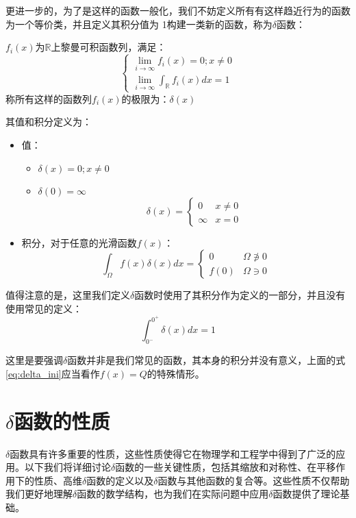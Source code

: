 \documentclass[lang=cn,10pt,newtx,bibend=biber,device=pad]{elegantbook}
\begin{document}
更进一步的，为了是这样的函数一般化，我们不妨定义所有有这样趋近行为的函数为一个等价类，并且定义其积分值为 1构建一类新的函数，称为$\delta$函数\cite{strichartz1994distribution}：
\begin{definition}[$\delta$函数]\label{def:delta_function}
${f_i(x)}$为$\mathbb{R}$上黎曼可积函数列，满足：
\begin{equation}
    \begin{cases}
        \lim\limits_{i\rightarrow\infty}f_i(x)=0;x\neq0\\
        \lim\limits_{i\rightarrow\infty}\int_{\mathbb{R}}f_i(x)dx = 1
    \end{cases}
\end{equation}
称所有这样的函数列${f_i(x)}$的极限为：$\delta(x)$

其值和积分定义为：
\begin{itemize}
    \item 值：
    \begin{itemize}
        \item $\delta(x) = 0;x\neq0$
        \item $\delta(0) = \infty$
        \begin{equation}
            \delta(x)=
            \begin{cases}
            0 &x\neq0 \\
            \infty &x=0
            \end{cases}
        \end{equation}
    \end{itemize}
    \item 积分，对于任意的光滑函数$f(x)$：
    \begin{equation}
        \int_{\Omega}f(x)\delta(x)dx=\begin{cases}0 & \Omega\not\owns0\\f(0)&\Omega\owns 0\end{cases}
    \end{equation}
\end{itemize}
\end{definition}
值得注意的是，这里我们定义$\delta$函数时使用了其积分作为定义的一部分，并且没有使用常见的定义：
\begin{equation}\label{eq:delta_ini}
    \int_{0^-}^{0^+}\delta(x)dx=1    
\end{equation}

这里是要强调$\delta$函数并非是我们常见的函数，其本身的积分并没有意义，上面的式\ref{eq:delta_ini}应当看作$f(x)=Q$的特殊情形。
\section{$\delta$函数的性质}
$\delta$函数具有许多重要的性质，这些性质使得它在物理学和工程学中得到了广泛的应用。以下我们将详细讨论$\delta$函数的一些关键性质，包括其缩放和对称性、在平移作用下的性质、高维$\delta$函数的定义以及$\delta$函数与其他函数的复合等。这些性质不仅帮助我们更好地理解$\delta$函数的数学结构，也为我们在实际问题中应用$\delta$函数提供了理论基础。
\end{document}
